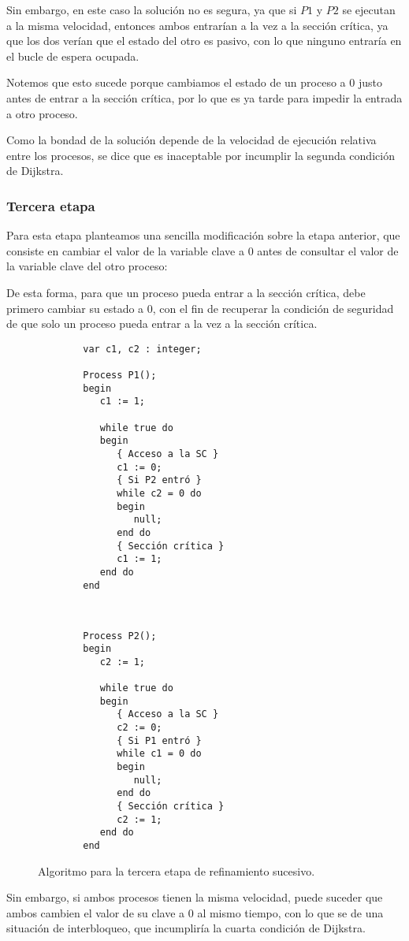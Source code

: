 Sin embargo, en este caso la solución no es segura, ya que si $P1$ y $P2$ se ejecutan a la misma velocidad, entonces ambos entrarían a la vez a la sección crítica, ya que los dos verían que el estado del otro es pasivo, con lo que ninguno entraría en el bucle de espera ocupada.

Notemos que esto sucede porque cambiamos el estado de un proceso a 0 justo antes de entrar a la sección crítica, por lo que es ya tarde para impedir la entrada a otro proceso.

Como la bondad de la solución depende de la velocidad de ejecución relativa entre los procesos, se dice que es inaceptable por incumplir la segunda condición de Dijkstra.

\subsubsection{Tercera etapa}
Para esta etapa planteamos una sencilla modificación sobre la etapa anterior, que consiste en cambiar el valor de la variable clave a 0 antes de consultar el valor de la variable clave del otro proceso:

De esta forma, para que un proceso pueda entrar a la sección crítica, debe primero cambiar su estado a 0, con el fin de recuperar la condición de seguridad de que solo un proceso pueda entrar a la vez a la sección crítica.
\begin{figure}[H]
\setlength{\columnsep}{1cm}
\begin{multicols}{2}
    \begin{verbatim}
        var c1, c2 : integer;
    
        Process P1();
        begin
           c1 := 1;
    
           while true do
           begin
              { Acceso a la SC }
              c1 := 0;
              { Si P2 entró }
              while c2 = 0 do
              begin
                 null;
              end do
              { Sección crítica }
              c1 := 1;
           end do
        end
    \end{verbatim}
    \begin{verbatim}

    
        Process P2();
        begin
           c2 := 1;
    
           while true do
           begin
              { Acceso a la SC }
              c2 := 0;
              { Si P1 entró }
              while c1 = 0 do
              begin
                 null;
              end do
              { Sección crítica }
              c2 := 1;
           end do
        end
    \end{verbatim}
\end{multicols}
\caption{Algoritmo para la tercera etapa de refinamiento sucesivo.}
\end{figure}
Sin embargo, si ambos procesos tienen la misma velocidad, puede suceder que ambos cambien el valor de su clave a 0 al mismo tiempo, con lo que se de una situación de interbloqueo, que incumpliría la cuarta condición de Dijkstra.

